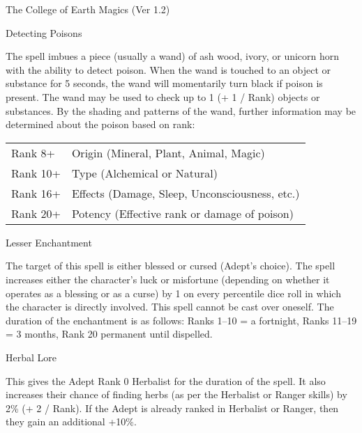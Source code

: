\begin{Chapter}{The College of Earth Magics (Ver 1.2)}
\begin{spell}[G-8]{Detecting Poisons}

\begin{effects}
The spell imbues a piece (usually a wand) of ash wood, ivory, or
unicorn horn with the ability to detect poison.  When the wand is
touched to an object or substance for 5 seconds, the wand will
momentarily turn black if poison is present.  The wand may be used to
check up to 1 (+ 1 / Rank) objects or substances. By the shading and
patterns of the wand, further information may be determined about the
poison based on rank:

\begin{tabularx}{\linewidth}{lX}
Rank 8+ & Origin (Mineral, Plant, Animal, Magic) \\
Rank 10+ & Type (Alchemical or Natural) \\
Rank 16+ & Effects (Damage, Sleep, Unconsciousness, etc.) \\
Rank 20+ & Potency (Effective rank or damage of poison) \\
\end{tabularx}

\end{effects}
\end{spell}

\begin{spell}[G-9]{Lesser Enchantment}

\begin{effects}
The target of this spell is either blessed or cursed (Adept’s choice).
The spell increases either the character’s luck or misfortune
(depending on whether it operates as a blessing or as a curse) by 1 on
every percentile dice roll in which the character is directly
involved.  This spell cannot be cast over oneself.  The duration of
the enchantment is as follows: Ranks 1–10 = a fortnight, Ranks 11–19 =
3 months, Rank 20 permanent until dispelled.
\end{effects}
\end{spell}

\begin{spell}[G-10]{Herbal Lore}

\begin{effects}
This gives the Adept Rank 0 Herbalist for the duration of the spell.
It also increases their chance of finding herbs (as per the Herbalist
or Ranger skills) by 2\% (+ 2 / Rank). If the Adept is already ranked
in Herbalist or Ranger, then they gain an additional +10\%.
\end{effects}
\end{spell}


\end{Chapter}
